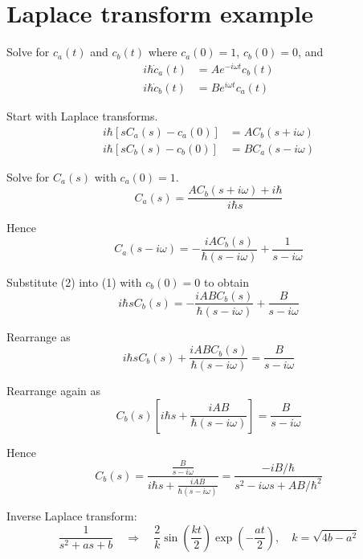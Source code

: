 

\section*{Laplace transform example}

Solve for $c_a(t)$ and $c_b(t)$ where $c_a(0)=1$, $c_b(0)=0$, and
\begin{align*}
i\hbar\dot c_a(t)&=Ae^{-i\omega t}c_b(t)
\\
i\hbar\dot c_b(t)&=Be^{i\omega t}c_a(t)
\end{align*}

Start with Laplace transforms.
\begin{align*}
i\hbar[sC_a(s)-c_a(0)]&=AC_b(s+i\omega)
\\
i\hbar[sC_b(s)-c_b(0)]&=BC_a(s-i\omega)
\tag{1}
\end{align*}

Solve for $C_a(s)$ with $c_a(0)=1$.
\begin{equation*}
C_a(s)=\frac{AC_b(s+i\omega)+i\hbar}{i\hbar s}
\end{equation*}

Hence
\begin{equation*}
C_a(s-i\omega)=-\frac{iAC_b(s)}{\hbar(s-i\omega)}+\frac{1}{s-i\omega}
\tag{2}
\end{equation*}

Substitute (2) into (1) with $c_b(0)=0$ to obtain
\begin{equation*}
i\hbar sC_b(s)=-\frac{iABC_b(s)}{\hbar(s-i\omega)}+\frac{B}{s-i\omega}
\end{equation*}

Rearrange as
\begin{equation*}
i\hbar sC_b(s)+\frac{iABC_b(s)}{\hbar(s-i\omega)}=\frac{B}{s-i\omega}
\end{equation*}

Rearrange again as
\begin{equation*}
C_b(s)\left[i\hbar s+\frac{iAB}{\hbar(s-i\omega)}\right]=\frac{B}{s-i\omega}
\end{equation*}

Hence
\begin{equation*}
C_b(s)=\frac
{\displaystyle\frac{B}{s-i\omega}}
{\displaystyle i\hbar s+\frac{iAB}{\hbar(s-i\omega)}}
=\frac{-iB/\hbar}{s^2-i\omega s+AB/\hbar^2}
\end{equation*}

Inverse Laplace transform:
\begin{equation*}
\frac{1}{s^2+as+b}\quad\Rightarrow\quad
\frac{2}{k}\sin\left(\frac{kt}{2}\right)\exp\left(-\frac{at}{2}\right),\quad
k=\sqrt{4b-a^2}
\end{equation*}

